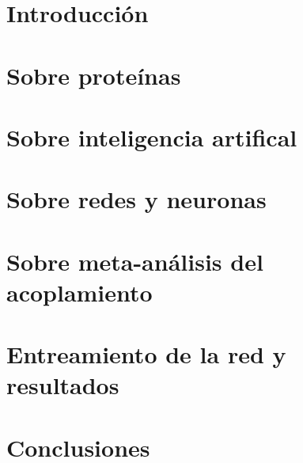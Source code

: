 \documentclass{book}
\begin{document}
\thispagestyle{empty}
\frontmatter
    
    \tableofcontents

\mainmatter
    \chapter*{Introducción}
        
    \chapter{Sobre proteínas}
        
    \chapter{Sobre inteligencia artifical}
        
    \chapter{Sobre redes y neuronas}
        
    \chapter{Sobre meta-análisis del acoplamiento}
        
    \chapter{Entreamiento de la red y resultados}
        
    \chapter{Conclusiones}
        


\backmatter
    \nocite{*}
    \printbibliography
\end{document}
